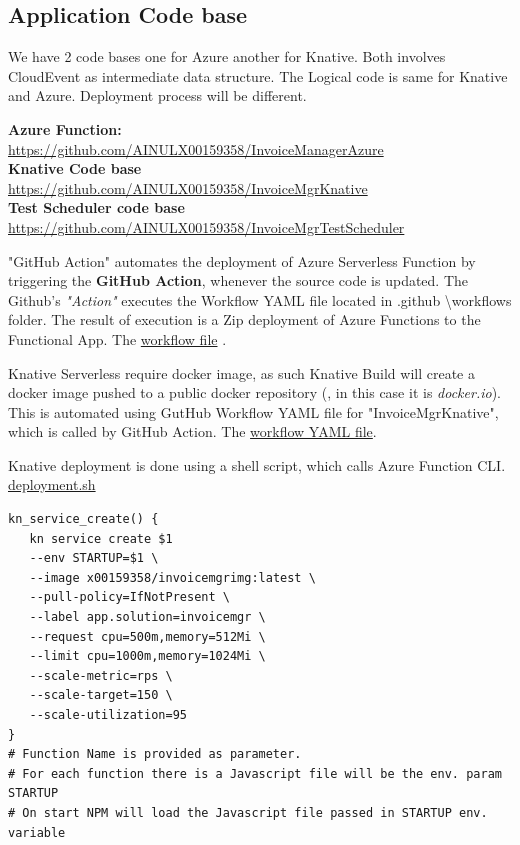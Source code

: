\documentclass{article}
\begin{document}
\begin{flushleft}
\subsection{Application Code base}
We have 2 code bases one for Azure another for Knative. Both involves CloudEvent as intermediate data structure. The Logical code is same for Knative and Azure. Deployment process will be different.
\par
\textbf{Azure Function:}\\
\url{https://github.com/AINULX00159358/InvoiceManagerAzure} \\
\textbf{Knative Code base}\\ 
\url{https://github.com/AINULX00159358/InvoiceMgrKnative}\\
\textbf{Test Scheduler code base}\\ \url{https://github.com/AINULX00159358/InvoiceMgrTestScheduler} 

\par
"GitHub Action" automates the deployment of Azure Serverless Function by triggering the \textbf{GitHub Action}, whenever the source code is updated. The Github's \textit{"Action"} executes the Workflow YAML file located in .github \textbackslash workflows folder. The result of execution is a Zip deployment of Azure Functions to the Functional App. The \href{https://github.com/AINULX00159358/InvoiceManagerAzure/blob/main/.github/workflows/main_invoicemgrapp.yml}{workflow file} .

\par
Knative Serverless require docker image, as such Knative Build will create a docker image pushed to a public docker repository (, in this case it is \textit{docker.io}). This is automated using GutHub Workflow YAML file for "InvoiceMgrKnative", which is called by GitHub Action. The \href{https://github.com/AINULX00159358/InvoiceMgrKnative/blob/main/.github/workflows/buildAndPush.yml}{workflow YAML file}. 
\par
Knative deployment is done using a shell script, which calls Azure Function \gls{CLI}. \href{https://github.com/AINULX00159358/InvoiceMgrKnative/blob/main/deployment.sh}{deployment.sh}

\begin{verbatim}
kn_service_create() {
   kn service create $1 
   --env STARTUP=$1 \  
   --image x00159358/invoicemgrimg:latest \  
   --pull-policy=IfNotPresent \
   --label app.solution=invoicemgr \
   --request cpu=500m,memory=512Mi \
   --limit cpu=1000m,memory=1024Mi \
   --scale-metric=rps \
   --scale-target=150 \
   --scale-utilization=95
}
# Function Name is provided as parameter.
# For each function there is a Javascript file will be the env. param STARTUP
# On start NPM will load the Javascript file passed in STARTUP env. variable
\end{verbatim}


\end{flushleft}
\end{document}
